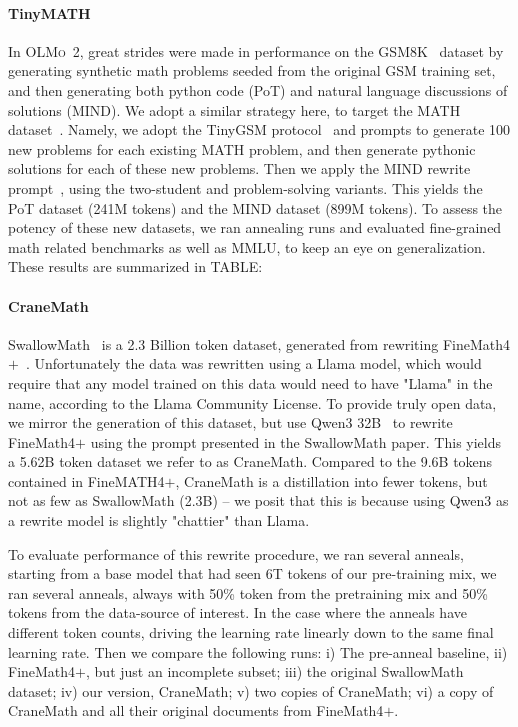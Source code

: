 \documentclass[table]{ai2style/ai2}
\newcommand{\oldOlmo}{OLMo\xspace}
\newcommand{\olmotoo}{\textsc{\oldOlmo~2}\xspace}
\begin{document}
{{\paragraph{TinyMATH}
In \olmotoo, great strides were made in performance on the GSM8K~\citep{cobbe2021gsm8k} dataset by generating synthetic math problems seeded from the original GSM training set, and then generating both python code (PoT) and natural language discussions of solutions (MIND). We adopt a similar strategy here, to target the MATH dataset~\citep{hendrycksmath2021}. Namely, we adopt the TinyGSM protocol~\citep{liu2023tinygsmachieving80gsm8k} and prompts to generate 100 new problems for each existing MATH problem, and then generate pythonic solutions for each of these new problems. Then we apply the MIND rewrite prompt~\citep{akter2024mindmathinformedsynthetic}, using the two-student and problem-solving variants. This yields the PoT dataset (241M tokens) and the MIND dataset (899M tokens). To assess the potency of these new datasets, we ran annealing runs and evaluated fine-grained math related benchmarks as well as MMLU, to keep an eye on generalization. These results are summarized in TABLE:

\paragraph{CraneMath}
SwallowMath~\citep{fujii2025rewriting} is a 2.3 Billion token dataset, generated from rewriting FineMath4$+$~\citep{allal2025smollm2smolgoesbig}. Unfortunately the data was rewritten using a Llama model, which would require that any model trained on this data would need to have "Llama" in the name, according to the Llama Community License. To provide truly open data, we mirror the generation of this dataset, but use Qwen3 32B~\cite{qwen3} to rewrite FineMath4$+$ using the prompt presented in the SwallowMath paper. This yields a 5.62B token dataset we refer to as CraneMath. Compared to the 9.6B tokens contained in FineMATH4$+$, CraneMath is a distillation into fewer tokens, but not as few as SwallowMath (2.3B) -- we posit that this is because using Qwen3 as a rewrite model is slightly "chattier" than Llama.

To evaluate performance of this rewrite procedure, we ran several anneals, starting from a base model that had seen 6T tokens of our pre-training mix, we ran several anneals, always with 50\% token from the pretraining mix and 50\% tokens from the data-source of interest. In the case where the anneals have different token counts, driving the learning rate linearly down to the same final learning rate. Then we compare the following runs: i) The pre-anneal baseline, ii) FineMath4$+$, but just an incomplete subset; iii) the original SwallowMath dataset; iv) our version, CraneMath; v) two copies of CraneMath; vi) a copy of CraneMath and all their original documents from FineMath4$+$.

}}
\end{document}
